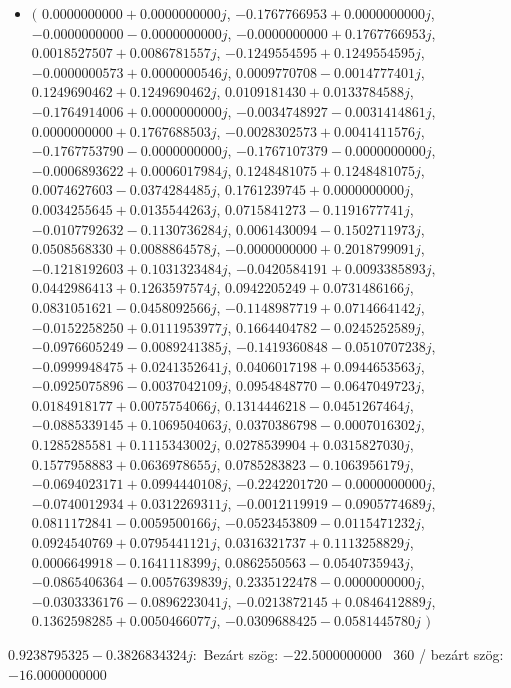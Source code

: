 \documentclass[14pt,a4paper]{article}
\begin{document}
\begin{itemize}
\item
$\big($
$0.0000000000+0.0000000000j$, $-0.1767766953+0.0000000000j$, $-0.0000000000-0.0000000000j$, $-0.0000000000+0.1767766953j$, $0.0018527507+0.0086781557j$, $-0.1249554595+0.1249554595j$, $-0.0000000573+0.0000000546j$, $0.0009770708-0.0014777401j$, $0.1249690462+0.1249690462j$, $0.0109181430+0.0133784588j$, $-0.1764914006+0.0000000000j$, $-0.0034748927-0.0031414861j$, $0.0000000000+0.1767688503j$, $-0.0028302573+0.0041411576j$, $-0.1767753790-0.0000000000j$, $-0.1767107379-0.0000000000j$, $-0.0006893622+0.0006017984j$, $0.1248481075+0.1248481075j$, $0.0074627603-0.0374284485j$, $0.1761239745+0.0000000000j$, $0.0034255645+0.0135544263j$, $0.0715841273-0.1191677741j$, $-0.0107792632-0.1130736284j$, $0.0061430094-0.1502711973j$, $0.0508568330+0.0088864578j$, $-0.0000000000+0.2018799091j$, $-0.1218192603+0.1031323484j$, $-0.0420584191+0.0093385893j$, $0.0442986413+0.1263597574j$, $0.0942205249+0.0731486166j$, $0.0831051621-0.0458092566j$, $-0.1148987719+0.0714664142j$, $-0.0152258250+0.0111953977j$, $0.1664404782-0.0245252589j$, $-0.0976605249-0.0089241385j$, $-0.1419360848-0.0510707238j$, $-0.0999948475+0.0241352641j$, $0.0406017198+0.0944653563j$, $-0.0925075896-0.0037042109j$, $0.0954848770-0.0647049723j$, $0.0184918177+0.0075754066j$, $0.1314446218-0.0451267464j$, $-0.0885339145+0.1069504063j$, $0.0370386798-0.0007016302j$, $0.1285285581+0.1115343002j$, $0.0278539904+0.0315827030j$, $0.1577958883+0.0636978655j$, $0.0785283823-0.1063956179j$, $-0.0694023171+0.0994440108j$, $-0.2242201720-0.0000000000j$, $-0.0740012934+0.0312269311j$, $-0.0012119919-0.0905774689j$, $0.0811172841-0.0059500166j$, $-0.0523453809-0.0115471232j$, $0.0924540769+0.0795441121j$, $0.0316321737+0.1113258829j$, $0.0006649918-0.1641118399j$, $0.0862550563-0.0540735943j$, $-0.0865406364-0.0057639839j$, $0.2335122478-0.0000000000j$, $-0.0303336176-0.0896223041j$, $-0.0213872145+0.0846412889j$, $0.1362598285+0.0050466077j$, $-0.0309688425-0.0581445780j$
$\big)$
\end{itemize}
$0.9238795325-0.3826834324j$:\
Bezárt szög: $-22.5000000000$ \
360 / bezárt szög: $-16.0000000000$\
\end{document}
